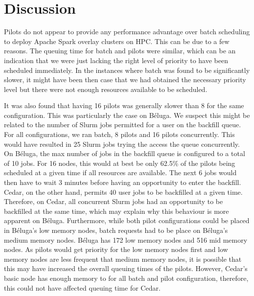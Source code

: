 \documentclass{IEEEtran}
\begin{document}
\section{Discussion}\label{sec:discussion}


Pilots do not appear to provide any performance advantage over batch
scheduling to deploy Apache Spark overlay clusters on HPC.
This can be due to a few reasons. The queuing time for batch and pilots were similar, 
which can be an indication that we were just lacking the right level of priority to 
have been scheduled immediately. In the instances where batch was found to be significantly slower,
it might have been then case that we had obtained the necessary priority level but there
were not enough resources available to be scheduled.

It was also found that having 16 pilots was generally slower than 8 for the same
configuration. This was particularly the case on B\'eluga. We suspect this might be
related to the number of Slurm jobs permitted for a user on the backfill queue. For
all configurations, we ran batch, 8 pilots and 16 pilots concurrently. This would have
resulted in 25 Slurm jobs trying the access the queue concurrently. On
B\'eluga, the max number of jobs in the backfill queue is configured to a
total of 10 jobs. For 16 nodes, this would at best be only 62.5\% of the
pilots being scheduled at a given time if all resources are available.
The next 6 jobs would then have to wait 3 minutes before having an opportunity to enter the
backfill. Cedar, on the other hand, permits 40 user jobs to be backfilled at a given time.
Therefore, on Cedar, all concurrent Slurm jobs had an opportunity to be backfilled at
the same time, which may explain why this behaviour is more apparent on B\'eluga. Furthermore,
while both pilot configurations could be placed in B\'eluga's low memory nodes, batch requests
had to be place on B\'eluga's medium memory nodes. B\'eluga has 172 low memory nodes and
516 mid memory nodes. As pilots would get priority for the low memory nodes first and 
low memory nodes are less frequent that medium memory nodes, it is possible that this
may have increased the overall queuing times of the pilots. However, Cedar's basic
node has enough memory to for all batch and pilot configuration, therefore, this could not
have affected queuing time for Cedar.
\end{document}

